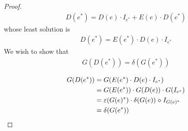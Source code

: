\documentclass{article}
\renewcommand\smash{\mathrel{\diamond}}
\renewcommand\star{^*}
\begin{document}
\begin{proof}
\begin{align*}
D(e\star) = D(e)\cdot I_{e^*} + E(e)\cdot D(e\star)
\end{align*}
whose least solution is 
\begin{align*}
D(e\star) = E(e\star)\cdot D(e)\cdot I_{e^*}
\end{align*}
We wish to show that
\begin{align*}
G(D(e\star)) = \delta(G(e\star))
\end{align*}

\begin{align*}
G(D(e\star)) &= G(E(e\star)\cdot D(e)\cdot I_{e^*})\\
&= G(E(e\star))\cdot G(D(e))\cdot G(I_{e^*})\\
&= \eps(G(e)\star)\cdot\delta(G(e))\smash I_{G(e)^*}\\
&= \delta(G(e\star))
\end{align*}

\end{proof}


\setlength{\itemsep}{-1ex}\small

\end{document}
